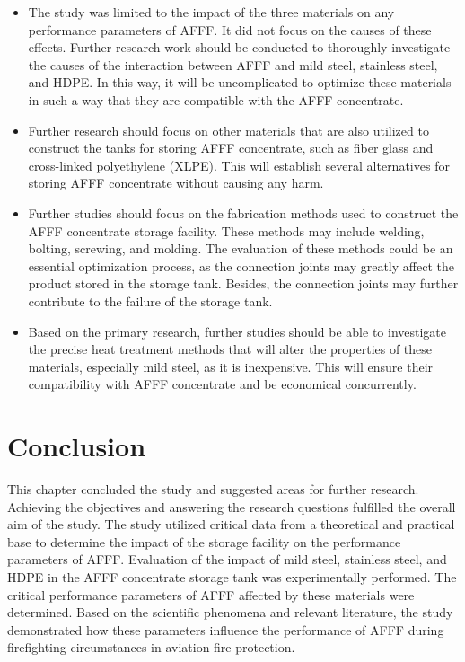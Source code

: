 \documentclass[12pt]{report}
\begin{document}
\begin{itemize}
    \item The study was limited to the impact of the three materials on any performance parameters of AFFF. It did not focus on the causes of these effects. Further research work should be conducted to thoroughly investigate the causes of the interaction between AFFF and mild steel, stainless steel, and HDPE. In this way, it will be uncomplicated to optimize these materials in such a way that they are compatible with the AFFF concentrate.
    \item Further research should focus on other materials that are also utilized to construct the tanks for storing AFFF concentrate, such as fiber glass and cross-linked polyethylene (XLPE). This will establish several alternatives for storing AFFF concentrate without causing any harm. 
    \item  Further studies should focus on the fabrication methods used to construct the AFFF concentrate storage facility. These methods may include welding, bolting, screwing, and molding. The evaluation of these methods could be an essential optimization process, as the connection joints may greatly affect the product stored in the storage tank. Besides, the connection joints may further contribute to the failure of the storage tank. 
    \item Based on the primary research, further studies should be able to investigate the precise heat treatment methods that will alter the properties of these materials, especially mild steel, as it is inexpensive. This will ensure their compatibility with AFFF concentrate and be economical concurrently.   
\end{itemize}

\section{Conclusion}
This chapter concluded the study and suggested areas for further research. Achieving the objectives and answering the research questions fulfilled the overall aim of the study. The study utilized critical data from a theoretical and practical base to determine the impact of the storage facility on the performance parameters of AFFF. Evaluation of the impact of mild steel, stainless steel, and HDPE in the AFFF concentrate storage tank was experimentally performed. The critical performance parameters of AFFF affected by these materials were determined. Based on the scientific phenomena and relevant literature, the study demonstrated how these parameters influence the performance of AFFF during firefighting circumstances in aviation fire protection. 
\end{document}
